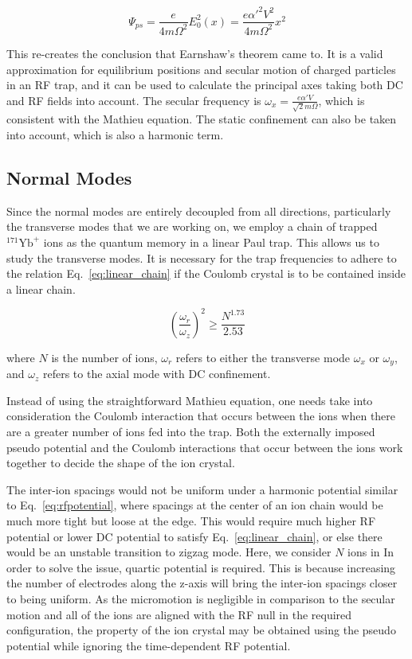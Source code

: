 \begin{equation}\label{eq:pseudo_potential}
    \Psi_{ps}=\frac{e}{4m\Omega^2}E_0^2(x)=\frac{e\alpha'^2V^2}{4m\Omega^2}x^2
\end{equation}

This re-creates the conclusion that Earnshaw's theorem came to. It is a valid approximation for equilibrium positions and secular motion of charged particles in an RF trap, and it can be used to calculate the principal axes taking both DC and RF fields into account. The secular frequency is \(\omega_x=\frac{e\alpha' V}{\sqrt{2}m\Omega}\), which is consistent with the Mathieu equation. The static confinement can also be taken into account, which is also a harmonic term.

\subsection{Normal Modes}

Since the normal modes are entirely decoupled from all directions, particularly the transverse modes that we are working on, we employ a chain of trapped ${ }^{171} \mathrm{Yb}^{+}$ ions as the quantum memory in a linear Paul trap. This allows us to study the transverse modes. It is necessary for the trap frequencies to adhere to the relation Eq.~\eqref{eq:linear_chain} if the Coulomb crystal is to be contained inside a linear chain.

\begin{equation}\label{eq:linear_chain}
    \left(\frac{\omega_r}{\omega_z}\right)^2 \geq \frac{N^{1.73}}{2.53}
\end{equation}

where \(N\) is the number of ions, \(\omega_r\) refers to either the transverse mode \(\omega_x\) or \(\omega_y\), and \(\omega_z\) refers to the axial mode with DC confinement.

Instead of using the straightforward Mathieu equation, one needs take into consideration the Coulomb interaction that occurs between the ions when there are a greater number of ions fed into the trap. Both the externally imposed pseudo potential and the Coulomb interactions that occur between the ions work together to decide the shape of the ion crystal.

The inter-ion spacings would not be uniform under a harmonic potential similar to Eq.~\eqref{eq:rfpotential}, where spacings at the center of an ion chain would be much more tight but loose at the edge. This would require much higher RF potential or lower DC potential to satisfy Eq.~\eqref{eq:linear_chain}, or else there would be an unstable transition to zigzag mode. Here, we consider \(N\) ions in In order to solve the issue, quartic potential is required. This is because increasing the number of electrodes along the z-axis will bring the inter-ion spacings closer to being uniform. As the micromotion is negligible in comparison to the secular motion and all of the ions are aligned with the RF null in the required configuration, the property of the ion crystal may be obtained using the pseudo potential while ignoring the time-dependent RF potential.

